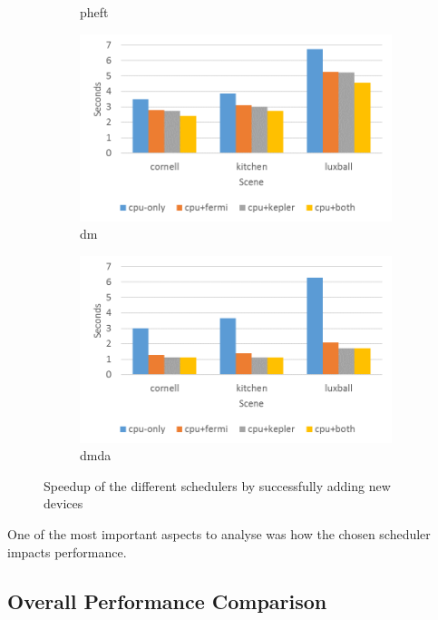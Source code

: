 \documentclass[main.tex]{subfiles}
\begin{document}
\begin{figure}[!htp]
\begin{subfigure}{.5\textwidth}
    \caption{pheft \label{fig:prof:starpu_sched_pheft}}
  \end{subfigure}
  \begin{subfigure}{.5\textwidth}
    \centering
    \includegraphics[width=\linewidth]{profiling/starpu_sched_dm}
    \caption{dm \label{fig:prof:starpu_sched_dm}}
  \end{subfigure}%
  \begin{subfigure}{.5\textwidth}
    \centering
    \includegraphics[width=\linewidth]{profiling/starpu_sched_dmda}
    \caption{dmda \label{fig:prof:starpu_sched_dmda}}
  \end{subfigure}
  \caption{Speedup of the different schedulers by successfully adding new devices \label{fig:prof:starpu_scheds}}
\end{figure}

One of the most important aspects to analyse was how the chosen scheduler impacts performance.

\subsection{Overall Performance Comparison}
\end{document}
